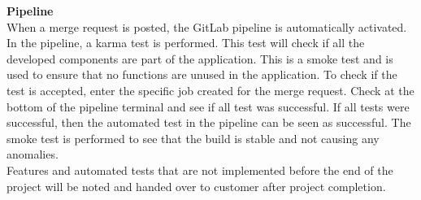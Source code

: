\noindent \textbf{Pipeline}\\
When a merge request is posted, the GitLab pipeline is automatically activated. In the pipeline, a karma test is performed. This test will check if all the developed components are part of the application. This is a smoke test and is used to ensure that no functions are unused in the application. To check if the test is accepted, enter the specific job created for the merge request. Check at the bottom of the pipeline terminal and see if all test was successful. If all tests were successful, then the automated test in the pipeline can be seen as successful. The smoke test is performed to see that the build is stable and not causing any anomalies.
\\ 
Features and automated tests that are not implemented before the end of the project will be noted and handed over to customer after project completion.  

